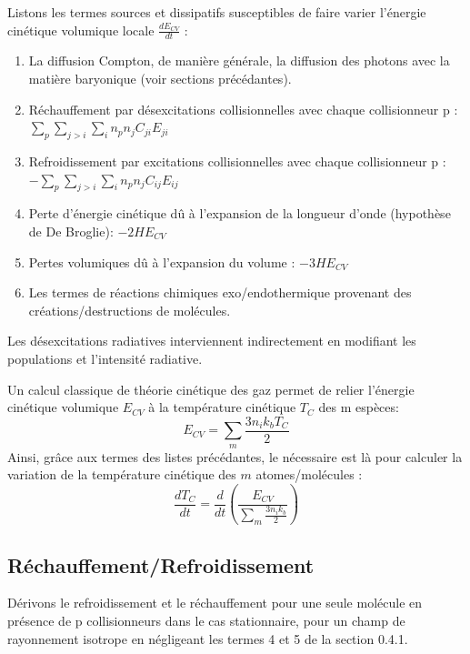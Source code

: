 \documentclass[10pt, a4paper]{report}
\numberwithin{equation}{subsection}
\begin{document}
Listons les termes sources et dissipatifs susceptibles de faire varier l'énergie cinétique volumique locale $\frac{dE_{CV} }{dt}$ :\\

\begin{enumerate}
	\item La diffusion Compton, de manière générale, la diffusion des photons avec la matière baryonique (voir sections précédantes).
	\item Réchauffement par désexcitations collisionnelles avec chaque collisionneur p :\\ $\sum\limits_p\sum\limits_{j>i}\sum\limits_i n_p n_j C_{ji}E_{ji}$
	\item Refroidissement par excitations collisionnelles avec chaque collisionneur p :\\ $-\sum\limits_p\sum\limits_{j>i}\sum\limits_i n_p n_j C_{ij}E_{ij}$
	\item Perte d'énergie cinétique dû à l'expansion de la longueur d'onde (hypothèse de De Broglie): $-2H E_{CV}$
	\item Pertes volumiques dû à l'expansion du volume : $-3H E_{CV}$
	\item Les termes de réactions chimiques exo/endothermique provenant des créations/destructions de molécules.
\end{enumerate}
\medskip
\normalsize
Les désexcitations radiatives interviennent indirectement en modifiant les populations et l'intensité radiative.

Un calcul classique de théorie cinétique des gaz permet de relier l'énergie cinétique volumique $E_{CV}$ à la température cinétique $T_C$ des m espèces:
\begin{equation} \label{eq:ECTC}
 \boxed{E_{CV} = \sum\limits_m  \frac{3 n_i k_b T_C}{2}}
\end{equation}
Ainsi, grâce aux termes des listes précédantes, le nécessaire est là pour calculer la variation de la température cinétique des $m$ atomes/molécules :
\begin{equation} \label{eq:VTC}
 \boxed{\frac{dT_C }{dt} = \frac{d}{dt}\left(\frac{E_{CV}}{\sum\limits_m  \frac{3 n_i k_b}{2}}\right)}
\end{equation}
\subsection{Réchauffement/Refroidissement}
Dérivons le refroidissement et le réchauffement pour une seule molécule en présence de p collisionneurs dans le cas stationnaire, pour un champ de rayonnement isotrope en négligeant les termes 4 et 5 de la  section 0.4.1.
\end{document}
